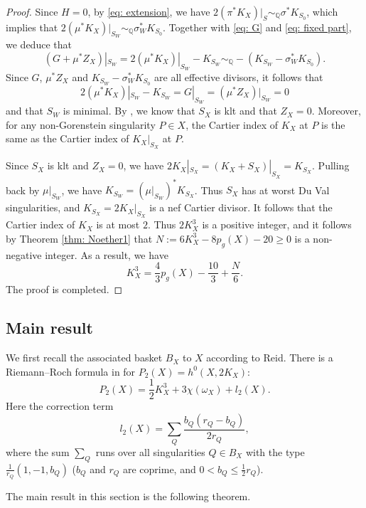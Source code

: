 \documentclass[a4paper,11pt]{amsart}
\theoremstyle{definition}
\theoremstyle{remark}
\numberwithin{equation}{section}
\begin{document}
\begin{proof}
	Since $H = 0$, by \eqref{eq: extension}, we have $2(\pi^*K_X)|_S \sim_{\mathbb{Q}} \sigma^*K_{S_0}$, which implies that $2(\mu^*K_X)|_{S_W} \sim_{\mathbb{Q}} \sigma_W^*K_{S_0}$. Together with \eqref{eq: G} and \eqref{eq: fixed part}, we deduce that
	$$
	(G+\mu^*Z_X)|_{S_W} = 2(\mu^*K_X)|_{S_W} - K_{S_W} \sim_{\mathbb{Q}} -(K_{S_W} - \sigma_W^*K_{S_0}).
	$$
	Since $G$, $\mu^*Z_X$ and $K_{S_W} - \sigma_W^*K_{S_0}$ are all effective divisors, it follows that 
	$$
	2(\mu^*K_X)|_{S_W} - K_{S_W} = G|_{S_W} = (\mu^*Z_X)|_{S_W}=0
	$$ 
	and that $S_W$ is minimal. By \cite[Lemma 3.4 and 3.5]{CHJ}, we know that $S_X$ is klt and that $Z_X = 0$. Moreover, for any non-Gorenstein singularity $P\in X$, the Cartier index of $K_X$ at $P$ is the same as the Cartier index of $K_X|_{S_X}$ at $P$.
	
	Since $S_X$ is klt and $Z_X = 0$, we have $2K_X|_{S_X} = (K_X+S_X)|_{S_X} = K_{S_X}$. Pulling back by $\mu|_{S_W}$, we have $K_{S_W} = (\mu|_{S_W})^*K_{S_X}$. Thus $S_X$ has at worst Du Val singularities, and $K_{S_X} = 2K_X|_{S_X}$ is a nef Cartier divisor. It follows that the Cartier index of $K_X$ is at most $2$. Thus $2K_X^3$ is a positive integer, and it follows by Theorem \ref{thm: Noether1} that $N := 6K_X^3 - 8p_g(X) - 20 \ge 0$ is a non-negative integer. As a result, we have
	$$
	K_X^3 = \frac{4}{3}p_g(X) - \frac{10}{3} + \frac{N}{6}.
	$$ 
	The proof is completed. 
\end{proof}

\subsection{Main result}
We first recall the associated basket $B_X$ to $X$ according to Reid. There is a Riemann--Roch formula in \cite[Corollary 10.3]{YPG} for $P_2(X) = h^0(X, 2K_X)$:
\begin{equation} \label{eq: Riemann-Roch P2}
	P_2(X) = \frac{1}{2}K_X^3 + 3\chi(\omega_X) + l_2(X).
\end{equation}
Here the correction term
\begin{equation} \label{eq: l2}
	l_2(X) = \sum_{Q} \frac{b_Q(r_Q - b_Q)}{2r_Q},
\end{equation}
where the sum $\sum_{Q}$ runs over all singularities $Q\in B_X$ with the type $\frac{1}{r_Q}(1, -1, b_Q)$ ($b_Q$ and $r_Q$ are coprime, and $0 < b_Q \le \frac{1}{2}r_Q$).

The main result in this section is the following theorem.
\end{document}
